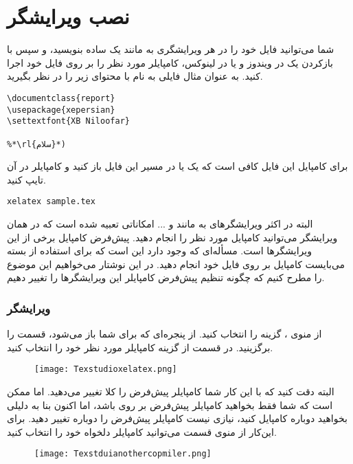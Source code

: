 \section{نصب ویرایشگر}
شما می‌توانید فایل 
 خود را در هر ویرایشگری به مانند یک 
 ساده بنویسید، و سپس با بازکردن یک 
در ویندوز و یا
 در لینوکس، کامپایلر مورد نظر را بر روی فایل خود اجرا کنید. به عنوان مثال فایلی به نام 
با محتوای زیر را در نظر بگیرید.
\begin{latin}
\begin{lstlisting}[style=Tex]
\documentclass{report}
\usepackage{xepersian}
\settextfont{XB Niloofar}
 
%*\rl{سلام}*)

\end{lstlisting}
\end{latin}
برای کامپایل این فایل کافی است که یک 
یا
 در مسیر این فایل باز کنید و کامپایلر 
 در آن تایپ کنید.
\begin{latin}
\begin{lstlisting}[style=Mybash]
xelatex sample.tex
\end{lstlisting}
\end{latin}
البته در اکثر ویرایشگرهای
به مانند  و ... امکاناتی تعبیه شده است که در همان ویرایشگر می‌توانید کامپایل مورد نظر را انجام دهید. پیش‌فرض کامپایل برخی از این ویرایشگرها  است. مسأله‌ای که وجود دارد این است که برای استفاده از بسته  می‌بایست کامپایل  بر روی فایل خود انجام دهید. در این نوشتار می‌خواهیم این موضوع را مطرح کنیم که چگونه تنظیم پیش‌فرض کامپایلر این ویرایشگر‌ها را تغییر دهیم.
\subsubsection{ویرایشگر }
از منوی ، گزینه  را انتخاب کنید. از پنجره‌ای که برای شما باز می‌شود، قسمت  را برگزینید. در قسمت  از گزینه  کامپایلر مورد نظر خود را انتخاب کنید.
\begin{figure}[h!]
 \centering\texttt{[image: Texstudioxelatex.png]}
\end{figure}
البته دقت کنید که با این کار شما کامپایلر پیش‌فرض را کلا تغییر می‌دهید. اما ممکن است که شما فقط بخواهید کامپایلر پیش‌فرض بر روی  باشد، اما اکنون بنا به دلیلی بخواهید دوباره  کامپایل کنید، نیازی نیست کامپایلر پیش‌فرض را دوباره تغییر دهید. برای این‌کار از منوی  قسمت  می‌توانید کامپایلر دلخواه خود را انتخاب کنید.
\begin{figure}[h!]
 \centering\texttt{[image: Texstduianothercopmiler.png]}
 \end{figure}
